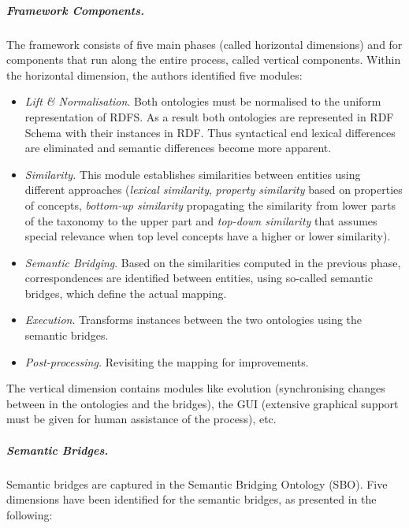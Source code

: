 \documentclass{fast_latex}
\begin{document}
\subparagraph{Framework Components.}
The framework consists of five main phases (called horizontal
dimensions) and for components that run along the entire process,
called vertical components. Within the horizontal dimension, the
authors identified five modules: 

\begin{itemize}
\item \textit{Lift \& Normalisation}. Both ontologies must be normalised
to the uniform representation of RDFS. As a result both ontologies are
represented in RDF Schema with their instances in RDF. Thus syntactical
end lexical differences are eliminated and semantic differences become
more apparent. 
\item \textit{Similarity.} This module establishes similarities between
entities using different approaches (\textit{lexical similarity},
\textit{property similarity} based on properties of concepts,
\textit{bottom-up similarity} propagating the similarity from lower
parts of the taxonomy to the upper part and \textit{top-down
similarity} that assumes special relevance when top level concepts have
a higher or lower similarity). 
\item \textit{Semantic Bridging}. Based on the similarities computed in
the previous phase, correspondences are identified between entities,
using so-called semantic bridges, which define the actual mapping. 
\item \textit{Execution}. Transforms instances between the two
ontologies using the semantic bridges. 
\item \textit{Post-processing.} Revisiting the mapping for improvements.

\end{itemize}
The vertical dimension contains modules like evolution (synchronising
changes between in the ontologies and the bridges), the GUI (extensive
graphical support must be given for human assistance of the process),
etc. 

\subparagraph{Semantic Bridges.}
Semantic bridges are captured in the Semantic Bridging Ontology (SBO).
Five dimensions have been identified for the semantic bridges, as
presented in the following: 
\end{document}
